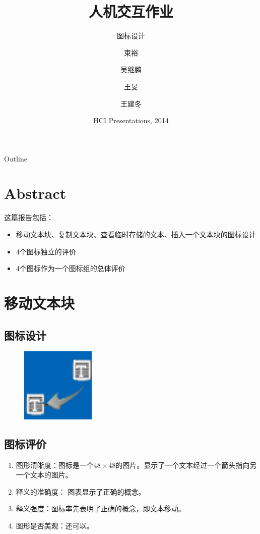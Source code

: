 ﻿\documentclass{beamer}
\title[Assignment 4] 
{人机交互作业}
\subtitle
{图标设计}
\author[Author] 
{束裕 \and 吴继鹏 \and 王旻 \and 王建冬}
\institute[Universities of Somewhere and Elsewhere] 
{
  Software Institute\\
  Nanjing University
}
\date[AFP 2003]
{HCI Presentations, 2014}
\begin{document}
\begin{frame}
  \titlepage
\end{frame}

\begin{frame}{Outline}
  \tableofcontents
\end{frame}

\section{Abstract}
\begin{frame}{这篇报告包括：}
  \begin{itemize}
  \item 移动文本块、复制文本块、查看临时存储的文本、插入一个文本块的图标设计
  \item 4个图标独立的评价
  \item 4个图标作为一个图标组的总体评价
  \end{itemize}
\end{frame}  


\section{移动文本块}
\subsection{图标设计}
\begin{frame}
  \begin{figure}[H]
  \includegraphics[width=1.4in]{img/1.PNG}
  \end{figure}
\end{frame}
\subsection{图标评价}
\begin{frame}
\begin{enumerate}
\item 图形清晰度：图标是一个$48\times 48$的图片。显示了一个文本经过一个箭头指向另一个文本的图片。
\item 释义的准确度： 图表显示了正确的概念。
\item 释义强度：图标率先表明了正确的概念，即文本移动。
\item 图形是否美观：还可以。
\end{enumerate}
\end{frame}
\end{document}
